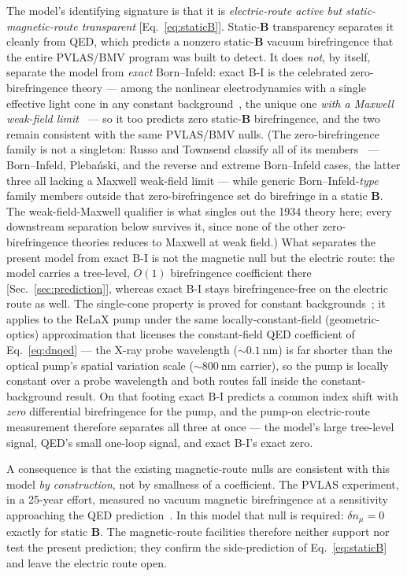 \documentclass[aps,prd,twocolumn,superscriptaddress,nofootinbib,longbibliography]{revtex4-2}
\begin{document}
The model's identifying signature is that it is \emph{electric-route active but
static-magnetic-route transparent} [Eq.~\eqref{eq:staticB}]. Static-$\mathbf B$
transparency separates it cleanly from QED, which predicts a nonzero
static-$\mathbf B$ vacuum birefringence that the entire PVLAS/BMV program was
built to detect. It does \emph{not}, by itself, separate the model from
\emph{exact} Born--Infeld: exact B-I is the celebrated zero-birefringence
theory --- among the nonlinear electrodynamics with a single effective light cone
in any constant background~\cite{Boillat1970}, the unique one \emph{with a Maxwell
weak-field limit}~\cite{BornInfeld1934} --- so it too predicts zero
static-$\mathbf B$ birefringence, and the two remain consistent with the same
PVLAS/BMV nulls. (The zero-birefringence family is not a singleton: Russo and
Townsend classify all of its members~\cite{RussoTownsend2023} --- Born--Infeld,
Plebański, and the reverse and extreme Born--Infeld cases, the latter three all
lacking a Maxwell weak-field limit --- while generic Born--Infeld-\emph{type} family members
outside that zero-birefringence set do birefringe in a static $\mathbf B$. The
weak-field-Maxwell qualifier is what singles out the 1934 theory here; every
downstream separation below survives it, since none of the other
zero-birefringence theories reduces to Maxwell at weak field.) What separates the present model from exact B-I
is not the magnetic null but the electric route: the model carries a tree-level,
$O(1)$ birefringence coefficient there [Sec.~\ref{sec:prediction}], whereas exact
B-I stays birefringence-free on the electric route as well. The single-cone
property is proved for constant
backgrounds~\cite{Boillat1970,RussoTownsend2023}; it applies to the ReLaX pump
under the same locally-constant-field (geometric-optics) approximation that
licenses the constant-field QED coefficient of Eq.~\eqref{eq:dnqed} --- the
X-ray probe wavelength ($\sim\SI{0.1}{\nano\meter}$) is far shorter than the
optical pump's spatial variation scale ($\sim\SI{800}{\nano\meter}$ carrier), so
the pump is locally constant over a probe wavelength and both routes fall inside
the constant-background result. On that footing exact B-I predicts a common index
shift with \emph{zero} differential birefringence for the pump, and the pump-on
electric-route measurement therefore separates all three at once --- the model's
large tree-level signal, QED's small one-loop signal, and exact B-I's exact
zero.

A consequence is that the existing magnetic-route nulls are consistent with this
model \emph{by construction}, not by smallness of a coefficient. The PVLAS
experiment, in a 25-year effort, measured no vacuum magnetic birefringence at a
sensitivity approaching the QED prediction~\cite{Ejlli2020}. In this model that
null is required: $\delta n_\mu=0$ exactly for static $\mathbf B$. The
magnetic-route facilities therefore neither support nor test the present
prediction; they confirm the side-prediction of Eq.~\eqref{eq:staticB} and leave
the electric route open.
\end{document}
